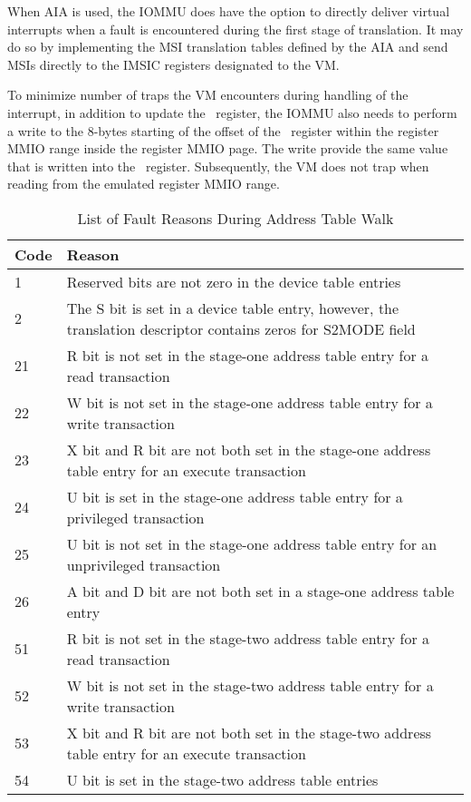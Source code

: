 When AIA is used, the IOMMU does have the option to directly deliver
virtual interrupts when a fault is encountered during the first stage of translation. It
may do so by implementing the MSI translation tables defined by the AIA and send MSIs
directly to the IMSIC registers designated to the VM.

To minimize number of traps the VM encounters during handling of the interrupt, in
addition to update the \ftval\ register, the IOMMU
also needs to perform a write to the 8-bytes starting of the offset of the \ftval\
register within the register MMIO range inside the register MMIO page. The write provide
the same value that is written into the \ftval\ register. Subsequently, the VM does not
trap when reading from the emulated register MMIO range.



\begin{table}
    \centering
    \begin{tabular}{| p{0.05\linewidth} | p{0.95\linewidth} |}
        \hline
         Code  & Reason \\
        \hline
         1      & Reserved bits are not zero in the device table entries \\
        \hline
         2      & The S bit is set in a device table entry, however, the translation descriptor contains zeros for S2MODE field \\
        \hline
         21     & R bit is not set in the stage-one address table entry for a read transaction \\
        \hline
         22     & W bit is not set in the stage-one address table entry for a write transaction  \\
        \hline
         23     & X bit and R bit are not both set in the stage-one address table entry for an execute transaction \\
        \hline
         24     & U bit is set in the stage-one address table entry for a privileged transaction \\
        \hline
         25     & U bit is not set in the stage-one address table entry for an unprivileged transaction \\
        \hline
         26     & A bit and D bit are not both set in a stage-one address table entry \\
        \hline
         51    & R bit is not set in the stage-two address table entry for a read transaction \\
        \hline
         52    & W bit is not set in the stage-two address table entry for a write transaction \\
        \hline
         53    & X bit and R bit are not both set in the stage-two address table entry for an execute transaction \\
        \hline
         54    & U bit is set in the stage-two address table entries \\
        \hline
    \end{tabular}
    \caption{List of Fault Reasons During Address Table Walk}
    \label{tbl:fault_reasons}
\end{table}

